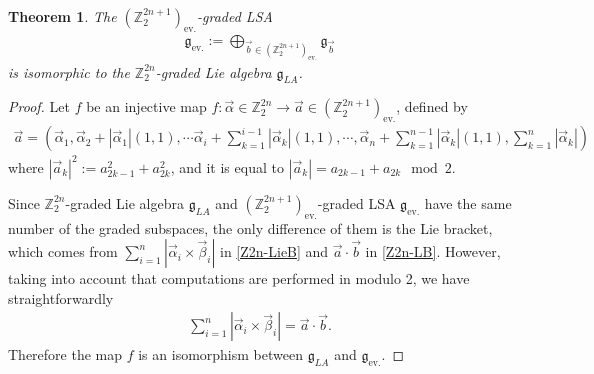 \documentclass[10pt,a4paper]{amsart}
\newtheorem{thm}{Theorem}
\def\Z{\mathbb{Z}}
\def\ev{\text{ev.}}
\def\g{\mathfrak{g}}
\def\ua{\alpha}
\def\ub{\beta}
\begin{document}
\begin{thm}
 The $(\Z_2^{2n+1})_{\ev}$-graded LSA 
\begin{align}
\g_{\ev}:=\bigoplus_{\vec{b}\in(\Z_2^{2n+1})_{\ev}}\g_{\vec{b}}
\end{align}
 is isomorphic to the $\Z_2^{2n}$-graded Lie algebra $\g_{LA}$.
\end{thm}

\begin{proof}
Let $f$ be an injective map $f: \vec{\ua}\in \Z_2^{2n}\to\vec{a}\in(\Z_2^{2n+1})_{\ev}$, defined by
\begin{align*}
\vec{a}=\left( \vec{\ua}_1, \vec{\ua}_2+|\vec{\ua}_1|(1,1),\cdots \vec{\ua}_i+\sum_{k=1}^{i-1}|\vec{\ua}_k|(1,1),\cdots, \vec{\ua}_{n}+\sum_{k=1}^{n-1}|\vec{\ua}_k|(1,1), \sum_{k=1}^{n}|\vec{\alpha}_k| \right)
\end{align*}
where  $|\vec{a}_k|^2:=a_{2k-1}^2+a_{2k}^2$, and it is equal to $|\vec{a}_k|=a_{2k-1}+a_{2k} \mod 2$.

Since $\Z_2^{2n}$-graded Lie algebra $\g_{LA}$ and $(\Z_2^{2n+1})_{\ev}$-graded LSA $\g_{\ev}$ have the same number of the graded subspaces, the only difference of them is the Lie bracket, which comes from $\sum_{i=1}^n |\vec{\ua}_i\times \vec{\ub}_i|$ in \eqref{Z2n-LieB} and $\vec{a}\cdot \vec{b}$ in \eqref{Z2n-LB}. However, taking into account that computations are performed in modulo 2, we have straightforwardly 
\begin{align}
 \sum_{i=1}^n |\vec{\ua}_i\times \vec{\ub}_i|=\vec{a}\cdot \vec{b}.
\end{align}
Therefore the map $f$ is an isomorphism between $\g_{LA}$ and $\g_{\ev}$.
\end{proof}
\end{document}
